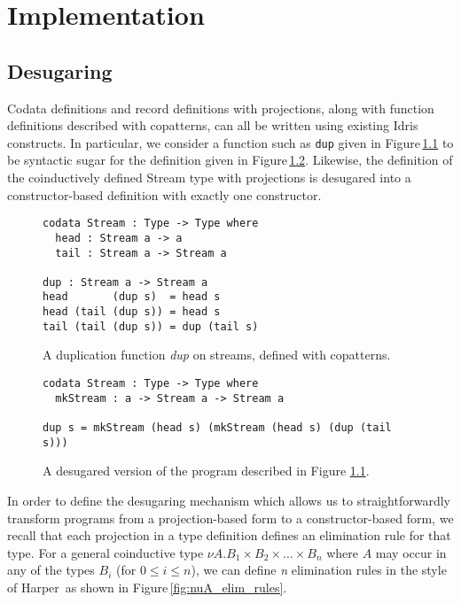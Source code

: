 \chapter{Implementation}

\section{Desugaring}
Codata definitions and record definitions with projections, along with function definitions described with copatterns, can all be written using existing Idris constructs. In particular, we consider a function such as \texttt{dup} given in Figure\,\ref{fig:dup_copatterns} to be syntactic sugar for the definition given in Figure\,\ref{fig:dup_desugared}. Likewise, the definition of the coinductively defined Stream type with projections is desugared into a constructor-based definition with exactly one constructor.

\begin{figure}
\begin{lstlisting}
codata Stream : Type -> Type where
  head : Stream a -> a
  tail : Stream a -> Stream a

dup : Stream a -> Stream a
head       (dup s)  = head s
head (tail (dup s)) = head s
tail (tail (dup s)) = dup (tail s)
\end{lstlisting}
\caption{A duplication function \textit{dup} on streams, defined with copatterns.}
\label{fig:dup_copatterns}
\end{figure}

\begin{figure}
\begin{lstlisting}
codata Stream : Type -> Type where
  mkStream : a -> Stream a -> Stream a

dup s = mkStream (head s) (mkStream (head s) (dup (tail s)))
\end{lstlisting}
\caption{A desugared version of the program described in Figure \ref{fig:dup_copatterns}.}
\label{fig:dup_desugared}
\end{figure}

In order to define the desugaring mechanism which allows us to straightforwardly transform programs from a projection-based form to a constructor-based form, we recall that each projection in a type definition defines an elimination rule for that type. For a general coinductive type $\nu A. B_1 \times B_2 \times \ldots \times B_n$ where $A$ may occur in any of the types $B_i$ (for $0 \leq i \leq n$), we can define \textit{n} elimination rules in the style of Harper\,\cite{Harper:2012} as shown in Figure\,\ref{fig:nuA_elim_rules}.

